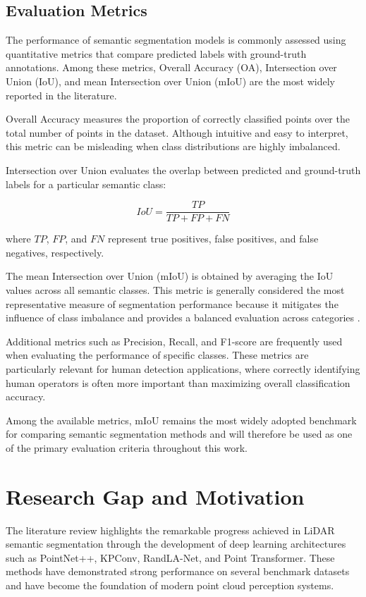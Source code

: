 \subsection{Evaluation Metrics}

The performance of semantic segmentation models is commonly assessed using quantitative metrics that compare predicted labels with ground-truth annotations. Among these metrics, Overall Accuracy (OA), Intersection over Union (IoU), and mean Intersection over Union (mIoU) are the most widely reported in the literature.

Overall Accuracy measures the proportion of correctly classified points over the total number of points in the dataset. Although intuitive and easy to interpret, this metric can be misleading when class distributions are highly imbalanced.

Intersection over Union evaluates the overlap between predicted and ground-truth labels for a particular semantic class:

\[
IoU = \frac{TP}{TP + FP + FN}
\]

where \(TP\), \(FP\), and \(FN\) represent true positives, false positives, and false negatives, respectively.

The mean Intersection over Union (mIoU) is obtained by averaging the IoU values across all semantic classes. This metric is generally considered the most representative measure of segmentation performance because it mitigates the influence of class imbalance and provides a balanced evaluation across categories \cite{Behley2019SemanticKITTI,Varney2020DALES}.

Additional metrics such as Precision, Recall, and F1-score are frequently used when evaluating the performance of specific classes. These metrics are particularly relevant for human detection applications, where correctly identifying human operators is often more important than maximizing overall classification accuracy.

Among the available metrics, mIoU remains the most widely adopted benchmark for comparing semantic segmentation methods and will therefore be used as one of the primary evaluation criteria throughout this work.

\section{Research Gap and Motivation}
\label{sec:research_gap}

The literature review highlights the remarkable progress achieved in LiDAR semantic segmentation through the development of deep learning architectures such as PointNet++, KPConv, RandLA-Net, and Point Transformer. These methods have demonstrated strong performance on several benchmark datasets and have become the foundation of modern point cloud perception systems.

